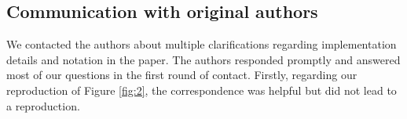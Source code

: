 \subsection{Communication with original authors}

We contacted the authors about multiple clarifications regarding implementation details and notation in the paper. The authors responded promptly and answered most of our questions in the first round of contact. Firstly, regarding our reproduction of Figure \ref{fig:2}, the correspondence was helpful but did not lead to a reproduction.
